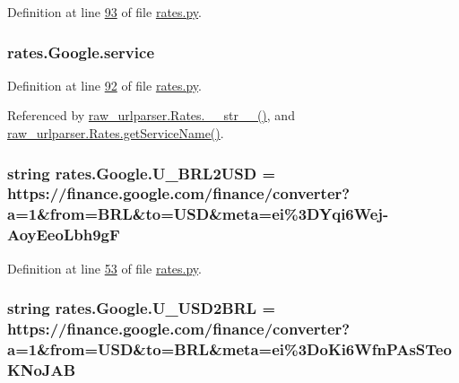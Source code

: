 Definition at line \hyperlink{rates_8py_source_l00093}{93} of file \hyperlink{rates_8py_source}{rates.\+py}.

\subsubsection[{\texorpdfstring{service}{service}}]{\setlength{\rightskip}{0pt plus 5cm}rates.\+Google.\+service}\hypertarget{classrates_1_1_google_a1da08e36d5007aa5293d048b625a35e9}{}\label{classrates_1_1_google_a1da08e36d5007aa5293d048b625a35e9}


Definition at line \hyperlink{rates_8py_source_l00092}{92} of file \hyperlink{rates_8py_source}{rates.\+py}.



Referenced by \hyperlink{raw__urlparser_8py_source_l00038}{raw\+\_\+urlparser.\+Rates.\+\_\+\+\_\+str\+\_\+\+\_\+()}, and \hyperlink{raw__urlparser_8py_source_l00035}{raw\+\_\+urlparser.\+Rates.\+get\+Service\+Name()}.

\subsubsection[{\texorpdfstring{U\+\_\+\+B\+R\+L2\+U\+SD}{U_BRL2USD}}]{\setlength{\rightskip}{0pt plus 5cm}string rates.\+Google.\+U\+\_\+\+B\+R\+L2\+U\+SD = \textquotesingle{}https\+://finance.\+google.\+com/finance/converter?a=1\&from=B\+RL\&to=U\+SD\&meta=ei\%3\+D\+Yqi6\+Wej-\/\+Aoy\+Eeo\+Lbh9g\+F\textquotesingle{}\hspace{0.3cm}{\ttfamily [static]}}\hypertarget{classrates_1_1_google_a46dbc3fa0a110bf5b66808c29642cfa1}{}\label{classrates_1_1_google_a46dbc3fa0a110bf5b66808c29642cfa1}


Definition at line \hyperlink{rates_8py_source_l00053}{53} of file \hyperlink{rates_8py_source}{rates.\+py}.

\subsubsection[{\texorpdfstring{U\+\_\+\+U\+S\+D2\+B\+RL}{U_USD2BRL}}]{\setlength{\rightskip}{0pt plus 5cm}string rates.\+Google.\+U\+\_\+\+U\+S\+D2\+B\+RL = \textquotesingle{}https\+://finance.\+google.\+com/finance/converter?a=1\&from=U\+SD\&to=B\+RL\&meta=ei\%3\+Do\+Ki6\+Wfn\+P\+As\+S\+Teo\+K\+No\+J\+A\+B\textquotesingle{}\hspace{0.3cm}{\ttfamily [static]}}\hypertarget{classrates_1_1_google_a77ef7f5932c48b002697fb187a234d4a}{}\label{classrates_1_1_google_a77ef7f5932c48b002697fb187a234d4a}


